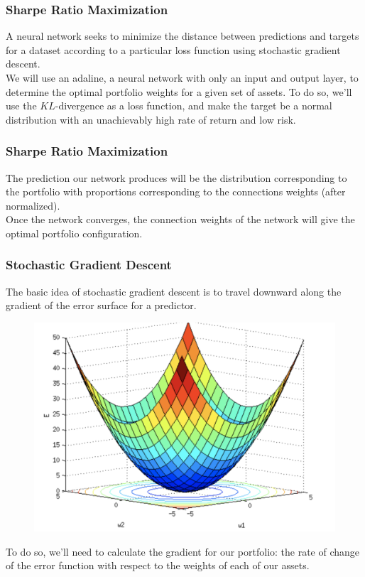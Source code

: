 \documentclass{beamer}
\begin{document}
\begin{frame}
\frametitle{Sharpe Ratio Maximization}
A neural network seeks to minimize the distance between predictions and targets for a dataset according to a particular loss function using stochastic gradient descent. 
\vspace{.1in}
\\We will use an adaline, a neural network with only an input and output layer, to determine the optimal portfolio weights for a given set of assets.  To do so, we'll use the $KL$-divergence as a loss function, and make the target be a normal distribution with an unachievably high rate of return and low risk.  
\end{frame}

\begin{frame}
\frametitle{Sharpe Ratio Maximization}
The prediction our network produces will be the distribution corresponding to the portfolio with proportions corresponding to the connections weights (after normalized).
\vspace{.1in}
\\Once the network converges, the connection weights of the network will give the optimal portfolio configuration.
\end{frame}

\begin{frame}
\frametitle{Stochastic Gradient Descent}
The basic idea of stochastic gradient descent is to travel downward along the gradient of the error surface for a predictor.
\begin{figure}[t]
\includegraphics[scale=0.4]{errorsurface}
\centering
\end{figure}
To do so, we'll need to calculate the gradient for our portfolio: the rate of change of the error function with respect to the weights of each of our assets.
\end{frame}
\end{document}
